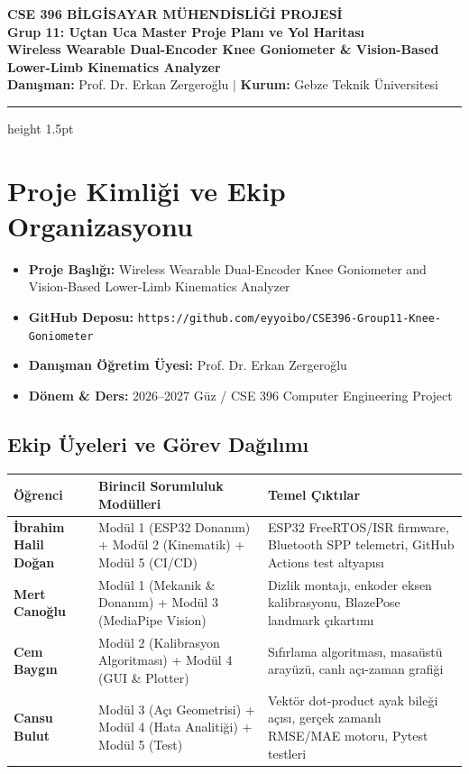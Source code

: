 \documentclass[11pt, a4paper]{article}
\begin{document}
\begin{center}
    {\LARGE \textbf{\textcolor{primary}{CSE 396 BİLGİSAYAR MÜHENDİSLİĞİ PROJESİ}}}\\[0.3em]
    {\Large \textbf{\textcolor{secondary}{Grup 11: Uçtan Uca Master Proje Planı ve Yol Haritası}}}\\[0.4em]
    {\normalsize \textbf{Wireless Wearable Dual-Encoder Knee Goniometer \& Vision-Based Lower-Limb Kinematics Analyzer}}\\[0.6em]
    \textbf{Danışman:} Prof. Dr. Erkan Zergeroğlu \quad $\vert$ \quad \textbf{Kurum:} Gebze Teknik Üniversitesi
\end{center}
\vspace{0.3em}
\hrule height 1.5pt
\vspace{0.8em}

\section{Proje Kimliği ve Ekip Organizasyonu}

\begin{itemize}[leftmargin=1.5em, itemsep=0.2em]
    \item \textbf{Proje Başlığı:} Wireless Wearable Dual-Encoder Knee Goniometer and Vision-Based Lower-Limb Kinematics Analyzer
    \item \textbf{GitHub Deposu:} \texttt{https://github.com/eyyoibo/CSE396-Group11-Knee-Goniometer}
    \item \textbf{Danışman Öğretim Üyesi:} Prof. Dr. Erkan Zergeroğlu
    \item \textbf{Dönem \& Ders:} 2026--2027 Güz / CSE 396 Computer Engineering Project
\end{itemize}

\subsection*{Ekip Üyeleri ve Görev Dağılımı}
\renewcommand{\arraystretch}{1.25}
\begin{tabularx}{\textwidth}{>{\bfseries}p{3.8cm} >{\raggedright\arraybackslash}X >{\raggedright\arraybackslash}p{4cm}}
\toprule
\rowcolor{lightgray} Öğrenci & Birincil Sorumluluk Modülleri & Temel Çıktılar \\
\midrule
İbrahim Halil Doğan & Modül 1 (ESP32 Donanım) + Modül 2 (Kinematik) + Modül 5 (CI/CD) & ESP32 FreeRTOS/ISR firmware, Bluetooth SPP telemetri, GitHub Actions test altyapısı \\
\midrule
Mert Canoğlu & Modül 1 (Mekanik \& Donanım) + Modül 3 (MediaPipe Vision) & Dizlik montajı, enkoder eksen kalibrasyonu, BlazePose landmark çıkartımı \\
\midrule
Cem Baygın & Modül 2 (Kalibrasyon Algoritması) + Modül 4 (GUI \& Plotter) & Sıfırlama algoritması, masaüstü arayüzü, canlı açı-zaman grafiği \\
\midrule
Cansu Bulut & Modül 3 (Açı Geometrisi) + Modül 4 (Hata Analitiği) + Modül 5 (Test) & Vektör dot-product ayak bileği açısı, gerçek zamanlı RMSE/MAE motoru, Pytest testleri \\
\bottomrule
\end{tabularx}
\end{document}
